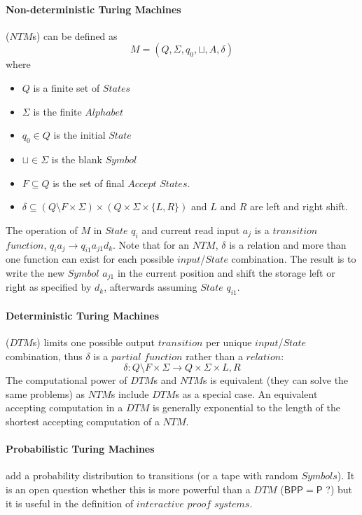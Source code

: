 \documentclass{article}
\begin{document}
\paragraph{Non-deterministic Turing Machines} ($NTM$s) can be defined
as
    \[
        M = (Q, \Sigma, q_0, \sqcup, A, \delta)
    \]
where
\begin{itemize}
\item $Q$ is a finite set of $States$
\item $\Sigma$ is the finite $Alphabet$
\item $q_0 \in Q$ is the initial $State$
\item $\sqcup \in \Sigma$ is the blank $Symbol$
\item $F \subseteq Q$ is the set of final $Accept$ $States$.
\item $\delta \subseteq (Q \setminus F \times \Sigma) \times (Q \times
  \Sigma \times \{L,R\})$ and $L$ and $R$ are left and right shift.
\end{itemize}
The operation of $M$ in $State$ $q_i$ and current read input $a_j$ is
a $transition$ $function$, $q_i a_j \rightarrow q_{i1} a_{j1}
d_k$. Note that for an $NTM$, $\delta$ is a relation and more than one
function can exist for each possible $input$/$State$ combination. The
result is to write the new $Symbol$ $a_{j1}$ in the current position
and shift the storage left or right as specified by $d_k$, afterwards
assuming $State$ $q_{i1}$.

\paragraph{Deterministic Turing Machines} ($DTM$s) limits one possible
output $transition$ per unique $input$/$State$ combination, thus
$\delta$ is a $partial$ $function$ rather than a $relation$:
\[
    \delta : Q \setminus F \times \Sigma \rightarrow Q \times
    \Sigma \times {L,R}
\]
The computational power of $DTM$s and $NTM$s is equivalent (they can
solve the same problems) as $NTM$s include $DTM$s as a special
case. An equivalent accepting computation in a $DTM$ is generally
exponential to the length of the shortest accepting computation of a
$NTM$.

\paragraph{Probabilistic Turing Machines} add a probability
distribution to transitions (or a tape with random $Symbols$). It is
an open question whether this is more powerful than a $DTM$
($\mathsf{BPP}=\mathsf{P}$ ?) but it is useful in the definition of
$interactive$ $proof$ $systems$.
\end{document}
